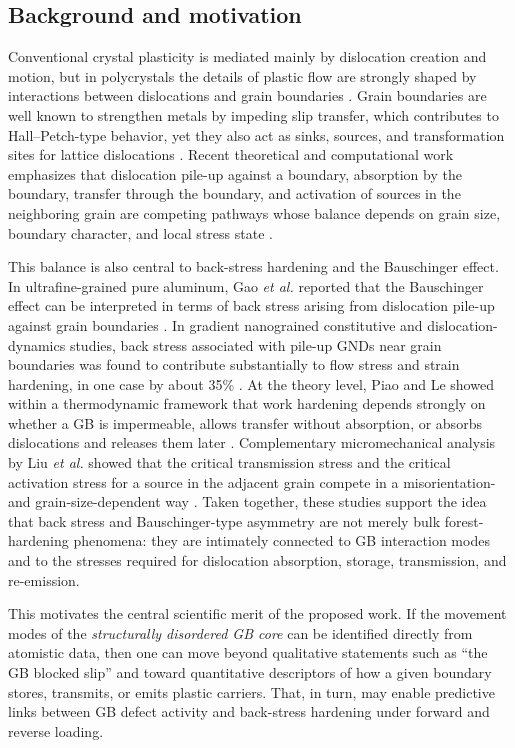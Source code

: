 \subsection*{Background and motivation}
Conventional crystal plasticity is mediated mainly by dislocation creation and motion, but in polycrystals the details of plastic flow are strongly shaped by interactions between dislocations and grain boundaries \cite{Cordero2016,Javaid2021}. Grain boundaries are well known to strengthen metals by impeding slip transfer, which contributes to Hall--Petch-type behavior, yet they also act as sinks, sources, and transformation sites for lattice dislocations \cite{Cordero2016,Javaid2021}. Recent theoretical and computational work emphasizes that dislocation pile-up against a boundary, absorption by the boundary, transfer through the boundary, and activation of sources in the neighboring grain are competing pathways whose balance depends on grain size, boundary character, and local stress state \cite{Piao2022,Liu2020}.

This balance is also central to back-stress hardening and the Bauschinger effect. In ultrafine-grained pure aluminum, Gao \emph{et al.} reported that the Bauschinger effect can be interpreted in terms of back stress arising from dislocation pile-up against grain boundaries \cite{Gao2022}. In gradient nanograined constitutive and dislocation-dynamics studies, back stress associated with pile-up GNDs near grain boundaries was found to contribute substantially to flow stress and strain hardening, in one case by about 35\% \cite{Zhao2020,WuDDD2022}. At the theory level, Piao and Le showed within a thermodynamic framework that work hardening depends strongly on whether a GB is impermeable, allows transfer without absorption, or absorbs dislocations and releases them later \cite{Piao2022}. Complementary micromechanical analysis by Liu \emph{et al.} showed that the critical transmission stress and the critical activation stress for a source in the adjacent grain compete in a misorientation- and grain-size-dependent way \cite{Liu2020}. Taken together, these studies support the idea that back stress and Bauschinger-type asymmetry are not merely bulk forest-hardening phenomena: they are intimately connected to GB interaction modes and to the stresses required for dislocation absorption, storage, transmission, and re-emission.

This motivates the central scientific merit of the proposed work. If the movement modes of the \emph{structurally disordered GB core} can be identified directly from atomistic data, then one can move beyond qualitative statements such as ``the GB blocked slip'' and toward quantitative descriptors of how a given boundary stores, transmits, or emits plastic carriers. That, in turn, may enable predictive links between GB defect activity and back-stress hardening under forward and reverse loading.

